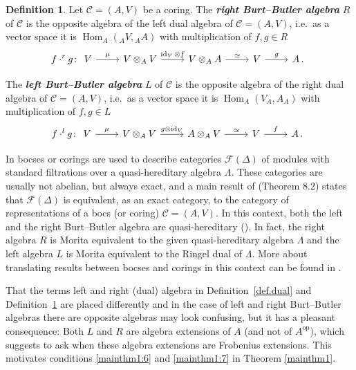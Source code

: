 \documentclass[12pt,a4paper]{amsart}
\theoremstyle{plain}
\theoremstyle{definition}
\newtheorem{defn}[thm]{Definition}
\numberwithin{equation}{thm}
\DeclareMathOperator{\id}{id}
\DeclareMathOperator{\Hom}{Hom}
\DeclareMathOperator{\op}{op}
\begin{document}
\begin{defn}\label{def.BB}
  Let $\mathcal{C}=(A,V)$ be a coring. The {\bf\em right Burt--Butler algebra} $R$ of $\mathcal C$ is
  the opposite algebra of the left dual algebra of $\mathcal{C}=(A,V)$, i.e.\ as a vector space it is $\Hom_A({}_AV,{}_AA)$ with multiplication of $f,g \in R$
  \[f \cdot^r g\colon \begin{tikzcd}
    V \arrow{r}{\mu} & V \otimes_A V \arrow{r}{\id_V \otimes f} &
V \otimes_A A \arrow{r}{\simeq} & V \arrow{r}{g} & A\,.
\end{tikzcd}  \]

  The {\bf \em left Burt--Butler algebra} $L$ of $\mathcal C$ is
  the opposite algebra of the right dual algebra of $\mathcal{C}=(A,V)$, i.e.\ as a vector space it is
  $\Hom_A(V_A,A_A)$ with multiplication of $f,g \in L$
  \[f \cdot^l g\colon \begin{tikzcd}
    V \arrow{r}{\mu} & V \otimes_A V \arrow{r}{g \otimes \id_V} &
A \otimes_A V \arrow{r}{\simeq} & V \arrow{r}{f} & A\,.
\end{tikzcd}  \]
\end{defn}

In \cite{KKO14} bocses or corings are used to describe categories
${\mathcal F}(\Delta)$
of modules with standard filtrations over a quasi-hereditary algebra
$\Lambda$.
These categories are usually not abelian, but always exact, and a main
result of \cite{KKO14} (Theorem 8.2) states that ${\mathcal F}(\Delta)$
is equivalent, as an
exact category, to the category of representations of a bocs (or coring)
$\mathcal{C}=(A,V)$. In this context, both the left and the right Burt--Butler algebra 
are quasi-hereditary (\cite[Theorem 11.2]{KKO14}). In fact, the right algebra $R$ is
Morita equivalent to the given quasi-hereditary algebra $\Lambda$ and the
left algebra $L$ is Morita equivalent to the Ringel dual of $\Lambda$.
More about translating results between bocses and corings in this context
can be found in \cite{BKK20}.

That the terms left and right (dual) algebra in Definition~\ref{def.dual} and Definition~\ref{def.BB}  are
placed differently and in the case of left and
right Burt--Butler algebras there are opposite algebras may look confusing, but
it has a pleasant consequence: Both $L$ and $R$ are algebra extensions of $A$
(and not of $A^{\op}$), which suggests to ask when these algebra extensions
are Frobenius extensions. This motivates conditions \eqref{mainthm1:6} and \eqref{mainthm1:7} in
Theorem \ref{mainthm1}.
\end{document}
